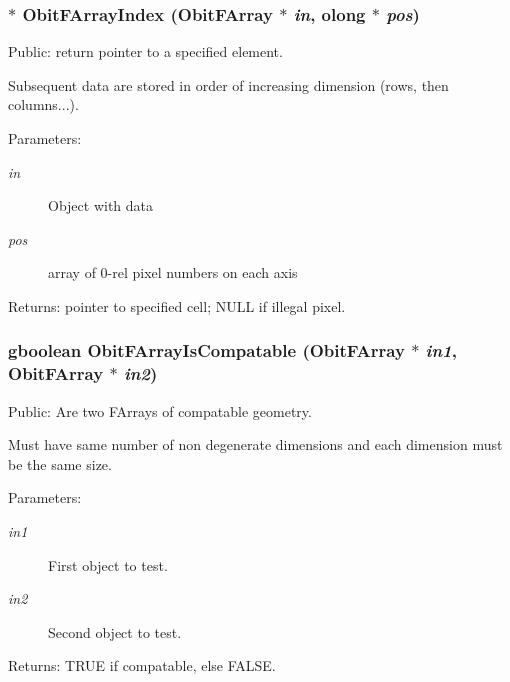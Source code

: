\subsubsection{$\ast$ Obit\-FArray\-Index ({\bf Obit\-FArray} $\ast$ {\em in}, {\bf olong} $\ast$ {\em pos})}\label{ObitFArray_8h_a64}


Public: return pointer to a specified element. 

Subsequent data are stored in order of increasing dimension (rows, then columns...). \begin{Desc}
\item[Parameters:]
\begin{description}
\item[{\em in}]Object with data \item[{\em pos}]array of 0-rel pixel numbers on each axis \end{description}
\end{Desc}
\begin{Desc}
\item[Returns:]pointer to specified cell; NULL if illegal pixel. \end{Desc}
\subsubsection{\setlength{\rightskip}{0pt plus 5cm}gboolean Obit\-FArray\-Is\-Compatable ({\bf Obit\-FArray} $\ast$ {\em in1}, {\bf Obit\-FArray} $\ast$ {\em in2})}\label{ObitFArray_8h_a62}


Public: Are two FArrays of compatable geometry. 

Must have same number of non degenerate dimensions and each dimension must be the same size. \begin{Desc}
\item[Parameters:]
\begin{description}
\item[{\em in1}]First object to test. \item[{\em in2}]Second object to test. \end{description}
\end{Desc}
\begin{Desc}
\item[Returns:]TRUE if compatable, else FALSE. \end{Desc}
